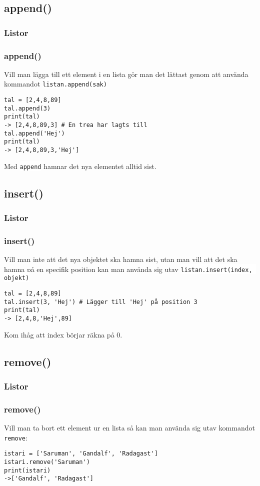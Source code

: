 \documentclass[aspectratio=169]{beamer}
\newcommand{\code}[1]{\colorbox{white}{\lstinline{#1}}}
\begin{document}
\subsection{append()}

\begin{frame}[fragile]
\frametitle{Listor}
\frametitle{append()}

Vill man lägga till ett element i en lista gör man det lättast genom att använda kommandot \code{listan.append(sak)}

\begin{lstlisting}
tal = [2,4,8,89]
tal.append(3)
print(tal)
-> [2,4,8,89,3] # En trea har lagts till
tal.append('Hej')
print(tal)
-> [2,4,8,89,3,'Hej']
\end{lstlisting}

Med \code{append} hamnar det nya elementet alltid sist.

\end{frame}

\subsection{insert()}

\begin{frame}[fragile]
\frametitle{Listor}
\frametitle{insert()}

Vill man inte att det nya objektet ska hamna sist, utan man vill att det ska hamna på en specifik position kan man använda sig utav \code{listan.insert(index, objekt)}

\begin{lstlisting}
tal = [2,4,8,89]
tal.insert(3, 'Hej') # Lägger till 'Hej' på position 3
print(tal)
-> [2,4,8,'Hej',89]
\end{lstlisting}

Kom ihåg att index börjar räkna på 0.

\end{frame}

\subsection{remove()}

\begin{frame}[fragile]
\frametitle{Listor}
\frametitle{remove()}

Vill man ta bort ett element ur en lista så kan man använda sig utav kommandot \code{remove}:

\begin{lstlisting}
istari = ['Saruman', 'Gandalf', 'Radagast']
istari.remove('Saruman')
print(istari)
->['Gandalf', 'Radagast']
\end{lstlisting}

\end{frame}
\end{document}
